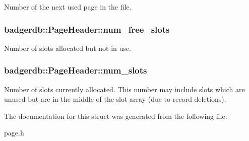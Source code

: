 Number of the next used page in the file. \hypertarget{structbadgerdb_1_1PageHeader_a7afd8d3c6f22b25e24958ebef773175e}{
\subsubsection[{num\-\_\-free\-\_\-slots}]{ badgerdb\-::\-Page\-Header\-::num\-\_\-free\-\_\-slots}}\label{structbadgerdb_1_1PageHeader_a7afd8d3c6f22b25e24958ebef773175e}
Number of slots allocated but not in use. \hypertarget{structbadgerdb_1_1PageHeader_a6c233369c611cfb617ba676e11a9d87d}{
\subsubsection[{num\-\_\-slots}]{ badgerdb\-::\-Page\-Header\-::num\-\_\-slots}}\label{structbadgerdb_1_1PageHeader_a6c233369c611cfb617ba676e11a9d87d}
Number of slots currently allocated. This number may include slots which are unused but are in the middle of the slot array (due to record deletions). 

The documentation for this struct was generated from the following file\-:\begin{DoxyCompactItemize}
\item 
page.\-h\end{DoxyCompactItemize}
